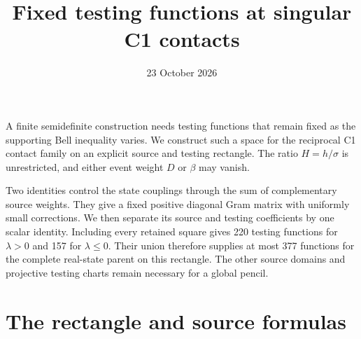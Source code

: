 \documentclass[11pt]{article}
\title{Fixed testing functions at singular C1 contacts}
\author{}\date{23 October 2026}
\begin{document}
\maketitle

A finite semidefinite construction needs testing functions that remain
fixed as the supporting Bell inequality varies. We construct such a space
for the reciprocal C1 contact family on an explicit source and testing
rectangle. The ratio $H=h/\sigma$ is unrestricted, and either event
weight $D$ or $\beta$ may vanish.

Two identities control the state couplings through the sum of complementary
source weights. They give a fixed positive diagonal Gram matrix with
uniformly small corrections. We then separate its source and testing
coefficients by one scalar identity. Including every retained square gives
220 testing functions for $\lambda>0$ and 157 for $\lambda\le0$.
Their union therefore supplies at most 377 functions for the complete
real-state parent on this rectangle. The other source domains and
projective testing charts remain necessary for a global pencil.

\section{The rectangle and source formulas}
\end{document}
